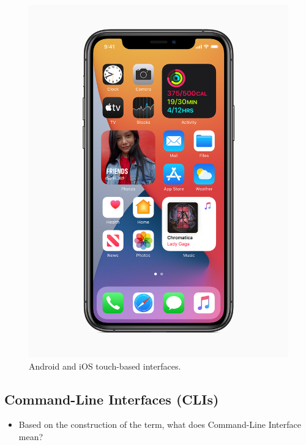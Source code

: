 \begin{frame}
\begin{figure}
    \includegraphics[height=0.8\textheight]{fig/ios14.jpg}
    \caption{Android and iOS touch-based interfaces.}
  \end{figure}
\end{frame}


\subsection{Command-Line Interfaces (CLIs)}

\begin{frame}
  \begin{exercise}
    \begin{itemize}
      \item Based on the construction of the term, what does Command-Line 
        Interface mean?
    \end{itemize}
  \end{exercise}
\end{frame}

